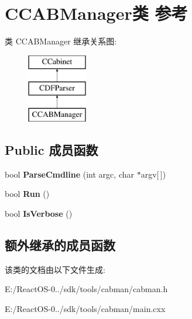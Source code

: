 \hypertarget{class_c_c_a_b_manager}{}\section{C\+C\+A\+B\+Manager类 参考}
\label{class_c_c_a_b_manager}
类 C\+C\+A\+B\+Manager 继承关系图\+:\begin{figure}[H]
\begin{center}
\leavevmode
\includegraphics[height=3.000000cm]{class_c_c_a_b_manager}
\end{center}
\end{figure}
\subsection*{Public 成员函数}
\begin{DoxyCompactItemize}
\item 
\mbox{\label{class_c_c_a_b_manager_acbfc9dc84469aef7500f0690ecf8b329}} 
bool {\bfseries Parse\+Cmdline} (int argc, char $\ast$argv\mbox{[}$\,$\mbox{]})
\item 
\mbox{\label{class_c_c_a_b_manager_ac19b4d2f66e13069f1a67d499d22aa6b}} 
bool {\bfseries Run} ()
\item 
\mbox{\label{class_c_c_a_b_manager_a18bf9fd3485d4cb6df0f7d18719d54b9}} 
bool {\bfseries Is\+Verbose} ()
\end{DoxyCompactItemize}
\subsection*{额外继承的成员函数}


该类的文档由以下文件生成\+:\begin{DoxyCompactItemize}
\item 
E\+:/\+React\+O\+S-\/0../sdk/tools/cabman/cabman.\+h\item 
E\+:/\+React\+O\+S-\/0../sdk/tools/cabman/main.\+cxx\end{DoxyCompactItemize}
